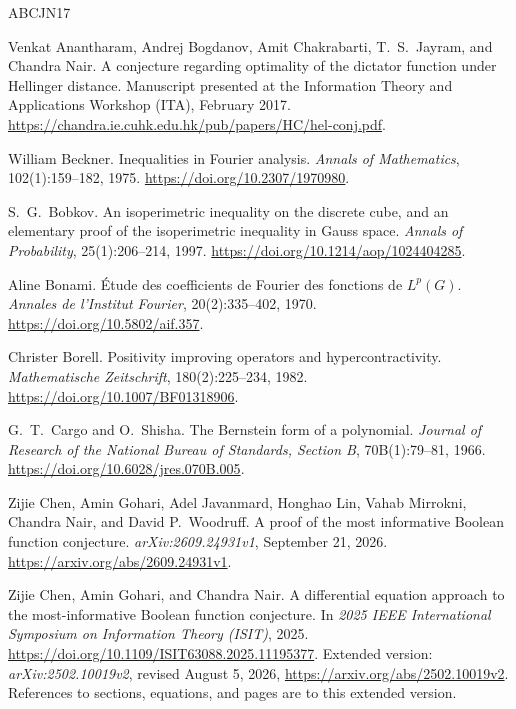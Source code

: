 \begin{thebibliography}{ABCJN17}

Venkat Anantharam, Andrej Bogdanov, Amit Chakrabarti, T.~S.~Jayram,
and Chandra Nair.
\newblock A conjecture regarding optimality of the dictator function under
Hellinger distance.
\newblock Manuscript presented at the Information Theory and Applications
Workshop (ITA), February 2017.
\newblock \url{https://chandra.ie.cuhk.edu.hk/pub/papers/HC/hel-conj.pdf}.

William Beckner.
\newblock Inequalities in Fourier analysis.
\newblock \emph{Annals of Mathematics}, 102(1):159--182, 1975.
\newblock \url{https://doi.org/10.2307/1970980}.

S.~G.~Bobkov.
\newblock An isoperimetric inequality on the discrete cube, and an elementary proof of the isoperimetric inequality in Gauss space.
\newblock \emph{Annals of Probability}, 25(1):206--214, 1997.
\newblock \url{https://doi.org/10.1214/aop/1024404285}.

Aline Bonami.
\newblock \'Etude des coefficients de Fourier des fonctions de $L^p(G)$.
\newblock \emph{Annales de l'Institut Fourier}, 20(2):335--402, 1970.
\newblock \url{https://doi.org/10.5802/aif.357}.

Christer Borell.
\newblock Positivity improving operators and hypercontractivity.
\newblock \emph{Mathematische Zeitschrift}, 180(2):225--234, 1982.
\newblock \url{https://doi.org/10.1007/BF01318906}.

G.~T.~Cargo and O.~Shisha.
\newblock The Bernstein form of a polynomial.
\newblock \emph{Journal of Research of the National Bureau of Standards, Section B}, 70B(1):79--81, 1966.
\newblock \url{https://doi.org/10.6028/jres.070B.005}.

Zijie Chen, Amin Gohari, Adel Javanmard, Honghao Lin, Vahab Mirrokni,
Chandra Nair, and David P.~Woodruff.
\newblock A proof of the most informative Boolean function conjecture.
\newblock \emph{arXiv:2609.24931v1}, September 21, 2026.
\newblock \url{https://arxiv.org/abs/2609.24931v1}.

Zijie Chen, Amin Gohari, and Chandra Nair.
\newblock A differential equation approach to the most-informative Boolean
function conjecture.
\newblock In \emph{2025 IEEE International Symposium on Information Theory
(ISIT)}, 2025.
\newblock \url{https://doi.org/10.1109/ISIT63088.2025.11195377}.
\newblock Extended version: \emph{arXiv:2502.10019v2}, revised August 5, 2026,
\url{https://arxiv.org/abs/2502.10019v2}.
\newblock References to sections, equations, and pages are to this extended
version.


\end{thebibliography}
